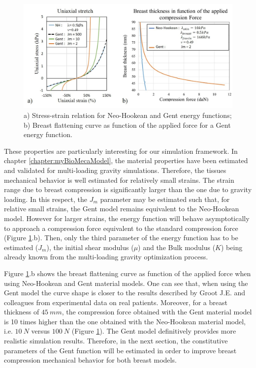 \begin{figure}[!h]
\centering
\includegraphics[width=1\textwidth,keepaspectratio]{figures/GentvsNeoStrain.jpg} 
\caption{a) Stress-strain relation for Neo-Hookean and Gent energy functions; b) Breast flattening curve as function of the applied force for a Gent energy function.}
\label{fig:GentvsNeoStrain}
\end{figure}

These properties are particularly interesting for our simulation framework. In chapter \ref{chapter:myBioMecaModel}, the material properties have been estimated and validated for multi-loading gravity simulations. Therefore, the tissues mechanical behavior is well estimated for relatively small strains. The strain range due to breast compression is significantly larger than the one due to gravity loading. In this respect, the $J_m$ parameter may be estimated such that, for relative small strains, the Gent model remains equivalent to the Neo-Hookean model. However for larger strains,  the energy function will behave asymptotically to approach a compression force equivalent to the standard compression force (Figure \ref{fig:GentvsNeoStrain}.b). Then, only the third parameter of the energy function has to be estimated ($J_m$), the initial shear modulus ($\mu$) and the Bulk modulus ($K$) being already known from the multi-loading gravity optimization process.

Figure \ref{fig:GentvsNeoStrain}.b shows the breast flattening curve as function of the applied force when using Neo-Hookean and Gent material models. One can see that, when using the Gent model the curve shape is closer to the results described by Groot J.E. and colleagues \citep{de_pain_2015} from experimental data on real patients. Moreover, for a breast thickness of $45 \ mm$, the compression force obtained with the Gent material model is 10 times higher than the one obtained with the Neo-Hookean material model, i.e. $10 \ N$ versus $100 \ N$ (Figure \ref{fig:GentvsNeoStrain}). The Gent model definitively provides more realistic simulation results. Therefore, in the next section, the constitutive parameters of the Gent function will be estimated in order to improve breast compression mechanical behavior for both breast models. 


